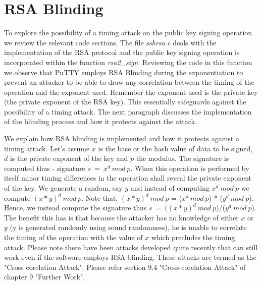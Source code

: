 \documentclass{report}
\begin{document}
\section{RSA Blinding}
To explore the possibility of a timing attack on the public key signing operation we review the relevant code sections. The file \textit{sshrsa.c} deals with the implementation of the RSA protocol and the public key signing operation is incorporated within the function \textit{rsa2\_sign}. Reviewing the code in this function we observe that PuTTY employs RSA Blinding during the exponentiation to prevent an attacker to be able to draw any correlation between the timing of the operation and the exponent used. Remember the exponent used is the private key (the private exponent of the RSA key). This essentially safeguards against the possibility of a timing  attack. The next paragraph discusses the implementation of the blinding process and how it protects against the attack.\par
We explain how RSA blinding is implemented and how it protects against a timing attack. Let's assume \(x\) is the base or the hash value of data to be signed, \(d\) is the private exponent of the key and \(p\) the modulus. The signature is computed thus - signature \(s\ =\ x^d\ mod\ p\). When this operation is performed by itself minor timing differences in the operation shall reveal the private exponent of the key. We generate a random, say \(y\) and instead of computing  \(x^d\ mod\ p\) we compute \((x*y)^d\ mod\ p\). Note that, \((x*y)^d\ mod\ p\) = (\(x^d\ mod\ p\)) * (\(y^d\ mod\ p\)). Hence, we instead compute the signature thus \(s\ =\ ((x*y)^d\ mod\ p\))/(\(y^d\ mod\ p\)). The benefit this has is that because the attacker has no knowledge of either \(x\) or \(y\) (y is generated randomly using sound randomness), he is unable to correlate the timing of the operation with the value of \(x\) which precludes the timing attack. Please note there have been attacks developed quite recently that can still work even if the software employs RSA blinding. These attacks are termed as the "Cross corelation Attack". Please refer section 9.4 "Cross-corelation Attack" \cite{praveen} of chapter 9 "Further Work".
\end{document}
